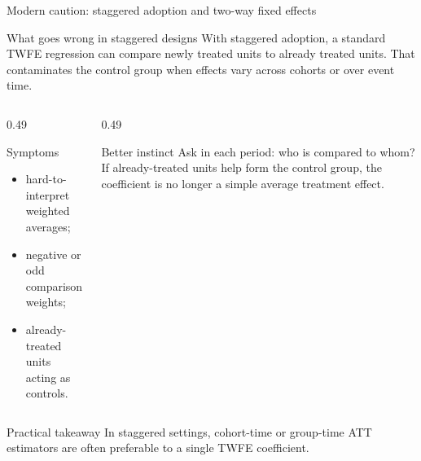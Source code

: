 \documentclass[10pt]{beamer}
\begin{document}
\begin{frame}{Modern caution: staggered adoption and two-way fixed effects}
\label{slide:did_twfe}
\small
\begin{block}{What goes wrong in staggered designs}
With staggered adoption, a standard TWFE regression can compare newly treated units to already treated units. That contaminates the control group when effects vary across cohorts or over event time.
\end{block}

\begin{columns}[T]
\begin{column}{0.49\textwidth}
\begin{exampleblock}{Symptoms}
\begin{itemize}
  \item hard-to-interpret weighted averages;
  \item negative or odd comparison weights;
  \item already-treated units acting as controls.
\end{itemize}
\end{exampleblock}
\end{column}
\begin{column}{0.49\textwidth}
\begin{exampleblock}{Better instinct}
Ask in each period: who is compared to whom? If already-treated units help form the control group, the coefficient is no longer a simple average treatment effect.
\end{exampleblock}
\end{column}
\end{columns}

\begin{alertblock}{Practical takeaway}
In staggered settings, cohort-time or group-time ATT estimators are often preferable to a single TWFE coefficient.
\end{alertblock}
\end{frame}
\end{document}
